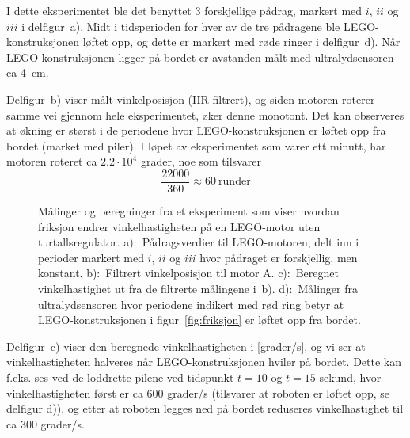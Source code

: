 I dette eksperimentet
ble det benyttet 3 forskjellige pådrag,
markert med $i$, $ii$ og $iii$ i delfigur~a). Midt i tidsperioden for 
hver av de tre pådragene 
ble LEGO-konstruksjonen løftet opp, og dette er
markert med røde ringer i delfigur~d).
 Når LEGO-konstruksjonen ligger på bordet er avstanden målt med
 ultralydsensoren ca
 4~cm.

 Delfigur~b) viser målt vinkelposisjon (IIR-filtrert), og siden motoren
roterer samme vei gjennom hele eksperimentet, øker denne monotont. Det kan
observeres at økning er størst i de periodene hvor LEGO-konstruksjonen
er løftet opp fra bordet
(market med piler).
I løpet av
eksperimentet som varer ett minutt, har motoren roteret 
ca $2.2{\cdot}10^{4}$ grader, noe som tilsvarer
\begin{equation}
  \label{eq:1}
  \frac{22000}{360} \approx 60 \mathrm{~runder}
\end{equation}

\newpage
\hspace*{0mm}
\begin{figure}[H]
  \centering
  \hspace*{-10mm}
  \caption{Målinger og beregninger fra et eksperiment som viser
    hvordan friksjon endrer vinkelhastigheten på en
    LEGO-motor uten turtallsregulator. a):~Pådragsverdier til LEGO-motoren, delt
    inn i perioder markert med $i$, $ii$ og $iii$ hvor pådraget er
    forskjellig, men konstant.
    b):~Filtrert vinkelposisjon til
    motor A. c):~Beregnet vinkelhastighet ut fra
    de filtrerte målingene i~b). d):~Målinger fra
    ultralydsensoren hvor periodene indikert med rød ring betyr at
    LEGO-konstruksjonen i figur~\ref{fig:friksjon} er løftet opp fra
    bordet. } 
  \label{fig:hastighet_uten}
\end{figure}

Delfigur~c) viser den beregnede vinkelhastigheten i [grader/s], og
vi ser at vinkelhastigheten halveres når LEGO-konstruksjonen hviler på
bordet. Dette kan f.eks. ses ved de loddrette pilene ved tidspunkt
$t{=}10$ og $t=15$ sekund, hvor  
vinkelhastigheten først er ca 600 grader/s (tilsvarer at roboten er løftet
opp, se delfigur d)), og etter at roboten legges ned på bordet 
reduseres vinkelhastighet til  ca 300 grader/s.


